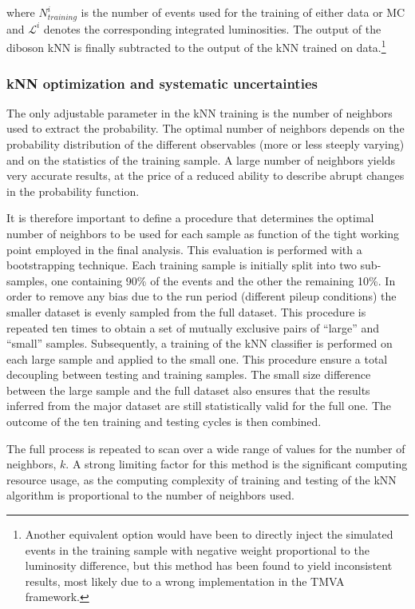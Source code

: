 where $N_{training}^{i}$ is the number of events used for the training of either data or MC and $\mathcal{L}^{i}$ denotes the corresponding integrated luminosities. The output of the diboson kNN is finally subtracted to the output of the kNN trained on data.\footnote{Another equivalent option would have been to directly inject the simulated events in the training sample with negative weight proportional to the luminosity difference, but this method has been found to yield inconsistent results, most likely due to a wrong implementation in the TMVA framework.}

\subsubsection{kNN optimization and systematic uncertainties}
\label{sec:kNN_uncertainties}

The only adjustable parameter in the kNN training is the number of neighbors used to extract the probability. 
The optimal number of neighbors depends on the probability distribution of the different observables (more or less steeply varying) and on the statistics of the training sample. 
A large number of neighbors yields very accurate results, at the price of a reduced ability to describe abrupt changes in the probability function.

It is therefore important to define a procedure that determines the optimal number of neighbors to be used for each sample as function of the tight working point employed in the final analysis. This evaluation is performed with a bootstrapping technique.
Each training sample is initially split into two sub-samples, one containing 90\% of the events and the other the remaining 10\%. In order to remove any bias due to the run period (different pileup conditions) the smaller dataset is evenly sampled from the full dataset. This procedure is repeated ten times to obtain a set of mutually exclusive pairs of ``large'' and ``small'' samples. Subsequently, a training of the kNN classifier is performed on each large sample and applied to the small one. This procedure ensure a total decoupling between testing and training samples. The small size difference between the large sample and the full dataset also ensures that the results inferred from the major dataset are still statistically valid for the full one. The outcome of the ten training and testing cycles is then combined. 

The full process is repeated to scan over a wide range of values for the number of neighbors, $k$. A strong limiting factor for this method is the significant computing resource usage, as the computing complexity of training and testing of the kNN algorithm is proportional to the number of neighbors used.%

